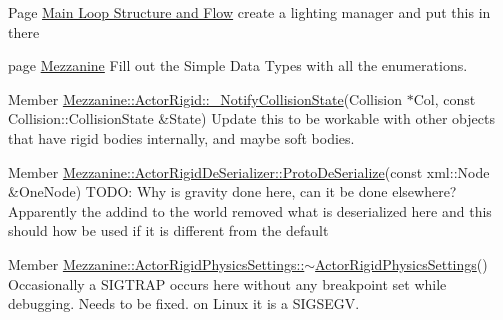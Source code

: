 \label{todo__todo000045}
\hypertarget{todo__todo000045}{}
 
\begin{DoxyDescription}
\item[Page \hyperlink{mainloop1}{Main Loop Structure and Flow} ]create a lighting manager and put this in there 
\end{DoxyDescription}

\label{todo__todo000046}
\hypertarget{todo__todo000046}{}
 
\begin{DoxyDescription}
\item[page \hyperlink{index}{Mezzanine} ]Fill out the Simple Data Types with all the enumerations.
\end{DoxyDescription}

\label{todo__todo000002}
\hypertarget{todo__todo000002}{}
 
\begin{DoxyDescription}
\item[Member \hyperlink{classMezzanine_1_1ActorRigid_a68827280395bc3b9e0266710ec44247d}{Mezzanine::ActorRigid::\_\-NotifyCollisionState}(Collision $\ast$Col, const Collision::CollisionState \&State) ]Update this to be workable with other objects that have rigid bodies internally, and maybe soft bodies. 
\end{DoxyDescription}

\label{todo__todo000003}
\hypertarget{todo__todo000003}{}
 
\begin{DoxyDescription}
\item[Member \hyperlink{classMezzanine_1_1ActorRigidDeSerializer_aff6fdcd7d7fdbc52e493ba2c8229b2e1}{Mezzanine::ActorRigidDeSerializer::ProtoDeSerialize}(const xml::Node \&OneNode) ]TODO: Why is gravity done here, can it be done elsewhere? Apparently the addind to the world removed what is deserialized here and this should how be used if it is different from the default 
\end{DoxyDescription}

\label{todo__todo000001}
\hypertarget{todo__todo000001}{}
 
\begin{DoxyDescription}
\item[Member \hyperlink{classMezzanine_1_1ActorRigidPhysicsSettings_a56d106b78dfa0ea5415c7928491e4fa7}{Mezzanine::ActorRigidPhysicsSettings::$\sim$ActorRigidPhysicsSettings}() ]Occasionally a SIGTRAP occurs here without any breakpoint set while debugging. Needs to be fixed. on Linux it is a SIGSEGV. 
\end{DoxyDescription}

